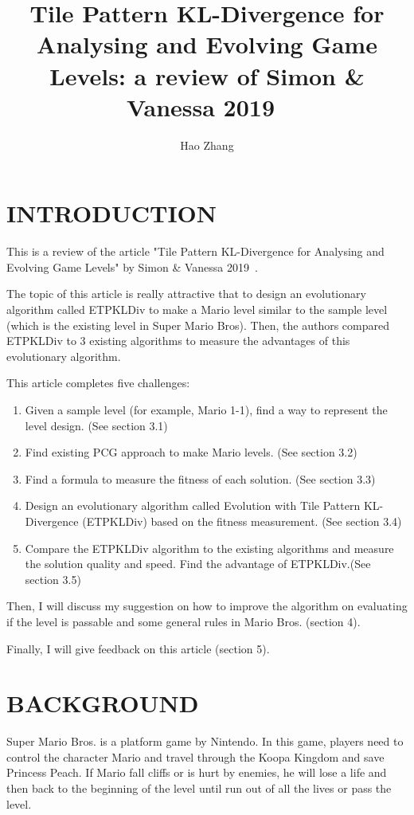 \documentclass[runningheads]{llncs}
\begin{document}
%
\title{Tile Pattern KL-Divergence for
Analysing and Evolving Game Levels: a review of Simon & Vanessa 2019~\cite{ref_lncs1}}
\author{Hao Zhang }
%
\maketitle          %
%

%
%
%
\section{INTRODUCTION}
This is a review of the article "Tile Pattern KL-Divergence for Analysing and Evolving Game Levels" by Simon & Vanessa 2019~\cite{ref_lncs1}.

The topic of this article is really attractive that to design an evolutionary algorithm called ETPKLDiv to make a Mario level similar to the sample level (which is the existing level in Super Mario Bros). Then, the authors compared ETPKLDiv  to 3 existing algorithms to measure the advantages of this evolutionary algorithm.

This article completes five challenges:
\begin{enumerate}
  \item Given a sample level (for example, Mario 1-1), find a way to represent the level design. (See section 3.1)
  \item Find existing PCG approach to make Mario levels. (See section 3.2)
  \item Find a formula to measure the fitness of each solution. (See section 3.3)
  \item Design an evolutionary algorithm called Evolution with Tile Pattern KL-Divergence (ETPKLDiv) based on the fitness measurement. (See section 3.4)
  \item Compare the ETPKLDiv algorithm to the existing algorithms and measure the solution quality and speed. Find the advantage of ETPKLDiv.(See section 3.5)
\end{enumerate}

Then, I will discuss my suggestion on how to improve the algorithm on evaluating if the level is passable and some general rules in Mario Bros. (section 4). 

Finally, I will give feedback on this article (section 5). 
\section{BACKGROUND}
Super Mario Bros. is a platform game by Nintendo. In this game, players need to control the character Mario and travel through the Koopa Kingdom and save Princess Peach. If Mario fall cliffs or is hurt by enemies, he will lose a life and then back to the beginning of the level until run out of all the lives or pass the level.
\end{document}
